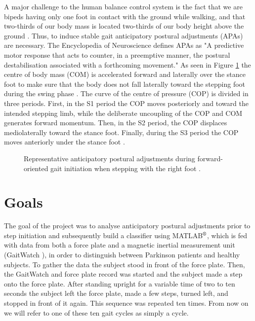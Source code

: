 A major challenge to the human balance control system is the fact that we are bipeds having only one foot in contact with the ground while walking, and that two-thirds  of our body mass is located two-thirds of our body height above the ground \cite{halliday_initiation_1998}. Thus, to induce stable gait anticipatory postural adjustments (APAs) are necessary. The Encyclopedia of Neuroscience \cite[p.133]{woollacott_anticipatory_2009} defines APAs as "A predictive motor response that acts to counter, in a preemptive manner, the postural destabilisation associated with a forthcoming movement." As seen in Figure \ref{fig:APAoverview} the centre of body mass (COM) is accelerated forward and laterally over the stance foot to make sure that the body does not fall laterally toward the stepping foot during the swing phase \cite{woollacott_anticipatory_2009}. The curve of the centre of pressure (COP) is divided in three periods. First, in the S1 period the COP moves posteriorly and toward the intended stepping limb, while the deliberate uncoupling of the COP and COM generates forward momentum. Then, in the S2 period, the COP displaces mediolaterally toward the stance foot. Finally, during the S3 period the COP moves anteriorly under the stance foot \cite{hass_gait_2005-1}.

\begin{figure}
	\centering
	\caption{Representative anticipatory postural adjustments during forward-oriented gait initiation when stepping with the right foot \cite{hass_gait_2005-1}.}
	\label{fig:APAoverview}
\end{figure}


\section{Goals}
\label{data_gathering_protocol}
The goal of the project was to analyse anticipatory postural adjustments prior to step initiation and subsequently build a classifier using MATLAB$\textsuperscript{\textregistered}$, which is fed with data from both a force plate and a magnetic inertial measurement unit (GaitWatch \cite{olivares_vicente_gaitwatch_2013}), in order to distinguish between Parkinson patients and healthy subjects. To gather the data the subject stood in front of the force plate. Then, the GaitWatch and force plate record was started and the subject made a step onto the force plate. After standing upright for a variable time of two to ten seconds the subject left the force plate, made a few steps, turned left, and stopped in front of it again. This sequence was repeated ten times. From now on we will refer to one of these ten gait cycles as simply a cycle.


